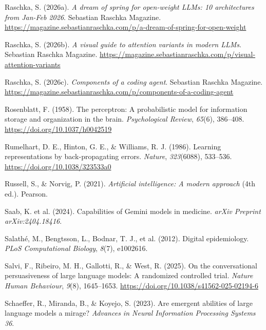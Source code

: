 \documentclass[
  letterpaper,
  11pt]{scrbook}
\newlength{\cslhangindent}
\newenvironment{CSLReferences}[2] %
 {\begin{list}{}{%
  \setlength{\itemindent}{0pt}
  \setlength{\leftmargin}{0pt}
  \setlength{\parsep}{0pt}
  \ifodd #1
   \setlength{\leftmargin}{\cslhangindent}
   \setlength{\itemindent}{-1\cslhangindent}
  \fi
  \setlength{\itemsep}{#2\baselineskip}}}
 {\end{list}}
\begin{document}
\begin{CSLReferences}{1}{0}
Raschka, S. (2026a). \emph{A dream of spring for open-weight {LLMs}: 10
architectures from {Jan-Feb} 2026}. Sebastian Raschka Magazine.
\url{https://magazine.sebastianraschka.com/p/a-dream-of-spring-for-open-weight}

Raschka, S. (2026b). \emph{A visual guide to attention variants in
modern {LLMs}}. Sebastian Raschka Magazine.
\url{https://magazine.sebastianraschka.com/p/visual-attention-variants}

Raschka, S. (2026c). \emph{Components of a coding agent}. Sebastian
Raschka Magazine.
\url{https://magazine.sebastianraschka.com/p/components-of-a-coding-agent}

Rosenblatt, F. (1958). The perceptron: A probabilistic model for
information storage and organization in the brain. \emph{Psychological
Review}, \emph{65}(6), 386--408. \url{https://doi.org/10.1037/h0042519}

Rumelhart, D. E., Hinton, G. E., \& Williams, R. J. (1986). Learning
representations by back-propagating errors. \emph{Nature},
\emph{323}(6088), 533--536. \url{https://doi.org/10.1038/323533a0}

Russell, S., \& Norvig, P. (2021). \emph{Artificial intelligence: A
modern approach} (4th ed.). Pearson.

{Saab, K. et al.} (2024). Capabilities of {Gemini} models in medicine.
\emph{arXiv Preprint arXiv:2404.18416}.

{Salathé, M., Bengtsson, L., Bodnar, T. J., et al.} (2012). Digital
epidemiology. \emph{PLoS Computational Biology}, \emph{8}(7), e1002616.

Salvi, F., Ribeiro, M. H., Gallotti, R., \& West, R. (2025). On the
conversational persuasiveness of large language models: A randomized
controlled trial. \emph{Nature Human Behaviour}, \emph{9}(8),
1645--1653. \url{https://doi.org/10.1038/s41562-025-02194-6}

Schaeffer, R., Miranda, B., \& Koyejo, S. (2023). Are emergent abilities
of large language models a mirage? \emph{Advances in Neural Information
Processing Systems 36}.


\end{CSLReferences}
\end{document}
